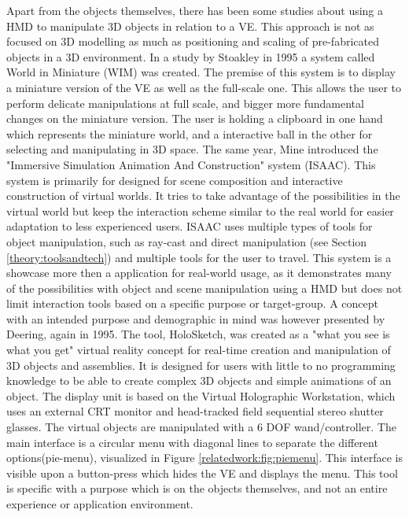 Apart from the objects themselves, there has been some studies about using a HMD to manipulate 3D objects in relation to a VE. This approach is not as focused on 3D modelling as much as positioning and scaling of pre-fabricated objects in a 3D environment. In a study by Stoakley in 1995 a system called World in Miniature (WIM) was created\cite{relatedwork:stoakley1995virtual}. The premise of this system is to display a miniature version of the VE as well as the full-scale one. This allows the user to perform delicate manipulations at full scale, and bigger more fundamental changes on the miniature version. The user is holding a clipboard in one hand which represents the miniature world, and a interactive ball in the other for selecting and manipulating in 3D space. The same year, Mine introduced the "Immersive Simulation
Animation And Construction" system (ISAAC)\cite{relatedwork:mine1995isaac}. This system is primarily for designed for scene composition and interactive construction of virtual worlds. It tries to take advantage of the possibilities in the virtual world but keep the interaction scheme similar to the real world for easier adaptation to less experienced users. ISAAC uses multiple types of tools for object manipulation, such as ray-cast and direct manipulation (see Section \ref{theory:toolsandtech}) and multiple tools for the user to travel. This system is a showcase more then a application for real-world usage, as it demonstrates many of the possibilities with object and scene manipulation using a HMD but does not limit interaction tools based on a specific purpose or target-group. A concept with an intended purpose and demographic in mind was however presented by Deering, again in 1995\cite{relatedwork:deering1995holosketch}. The tool, HoloSketch, was created as a "what you see is what you get" virtual reality concept for real-time creation and manipulation of 3D objects and assemblies. It is designed for users with little to no programming knowledge to be able to create complex 3D objects and simple animations of an object. The display unit is based on the Virtual Holographic Workstation\cite{relatedwork:deering1992high}, which uses an external CRT monitor and head-tracked field sequential stereo shutter glasses. The virtual objects are manipulated with a 6 DOF wand/controller. The main interface is a circular menu with diagonal lines to separate the different options(pie-menu), visualized in Figure \ref{relatedwork:fig:piemenu}. This interface is visible upon a button-press which hides the VE and displays the menu. This tool is specific with a purpose which is on the objects themselves, and not an entire experience or application environment.
